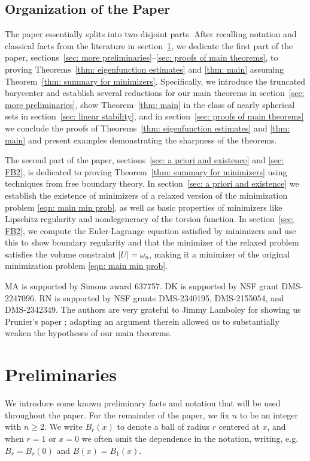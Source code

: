 \documentclass[10pt, reqno]{amsart}
\numberwithin{equation}{section}
\def\om{\omega}
\begin{document}
\subsection*{Organization of the Paper}

The paper  essentially splits into two disjoint parts. After recalling notation and classical facts from the literature in section~\ref{sec: prelim},  we dedicate the first part of the paper, sections~\ref{sec: more preliminaries}--\ref{sec: proofs of main theorems}, to proving Theorems~\ref{thm: eigenfunction estimates} and \ref{thm: main} assuming Theorem~\ref{thm: summary for minimizers}. Specifically, we introduce the truncated barycenter and establish several reductions for our main theorems in section~\ref{sec: more preliminaries}, show  Theorem~\ref{thm: main} in the class of nearly spherical sets in section~\ref{sec: linear stability}, and in section~\ref{sec: proofs of main theorems} we conclude the proofs of Theorems~\ref{thm: eigenfunction estimates} and \ref{thm: main} and present examples demonstrating the sharpness of the theorems. 

The second part of the paper, sections~\ref{sec: a priori and existence} and \ref{sec: FB2},  is dedicated to proving Theorem~\ref{thm: summary for minimizers} using techniques from  free boundary theory. In section~\ref{sec: a priori and existence} we establish the existence of minimizers of a relaxed version of the minimization problem \eqref{eqn: main min prob}, as well as basic properties of minimizers like Lipschitz regularity and nondegeneracy of the torsion function. In section~\ref{sec: FB2}, we compute the Euler-Lagrange equation satisfied by minimizers and use this to show boundary regularity and that the minimizer of the relaxed problem satisfies the volume constraint $|U| =\om_n$, making it a minimizer of the original minimization problem \eqref{eqn: main min prob}.  
% 
\medskip


 MA is supported by Simons award 637757.
DK is supported by NSF grant DMS-2247096.
RN is supported by NSF grants DMS-2340195, DMS-2155054, and DMS-2342349. The authors are very grateful to Jimmy Lamboley for showing us Prunier's paper \cite{p24}; adapting an argument therein allowed us to substantially weaken the hypotheses of our main theorems.

\section{Preliminaries}\label{sec: prelim}
We introduce some known preliminary facts and notation that will be used throughout the paper. For the remainder of the paper, we fix $n$ to be an integer with $n\geq 2.$
 We write $B_r(x)$ to denote a ball of radius $r$ centered at $x$, and when $r=1$ or $x=0$ we often omit the dependence in the notation, writing, e.g. $B_r = B_r(0)$ and $B(x) = B_1(x).$
\end{document}
